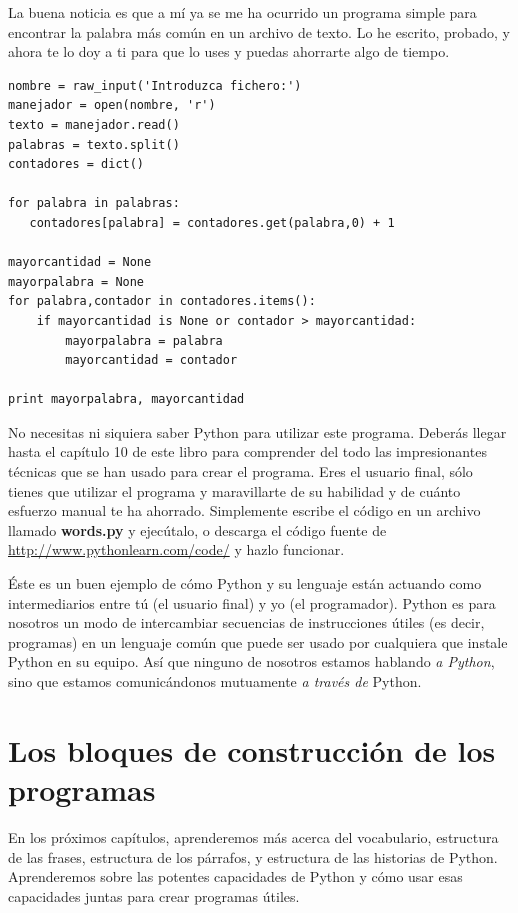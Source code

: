 La buena noticia es que a mí ya se me ha ocurrido un programa
simple para encontrar la palabra más común en un archivo de texto. Lo he escrito,
probado, y ahora te lo doy a ti para que lo uses y puedas ahorrarte algo de tiempo.

\beforeverb
\begin{verbatim}
nombre = raw_input('Introduzca fichero:')
manejador = open(nombre, 'r')
texto = manejador.read()
palabras = texto.split()
contadores = dict()

for palabra in palabras:
   contadores[palabra] = contadores.get(palabra,0) + 1

mayorcantidad = None
mayorpalabra = None
for palabra,contador in contadores.items():
    if mayorcantidad is None or contador > mayorcantidad:
        mayorpalabra = palabra
        mayorcantidad = contador

print mayorpalabra, mayorcantidad
\end{verbatim}
\afterverb
%
No necesitas ni siquiera saber Python para utilizar este programa. Deberás llegar hasta
el capítulo 10 de este libro para comprender del todo las impresionantes técnicas que
se han usado para crear el programa. Eres el usuario final, sólo tienes que utilizar el
programa y maravillarte de su habilidad y de cuánto esfuerzo manual te ha ahorrado.
Simplemente escribe el código
en un archivo llamado {\bf words.py} y ejecútalo, o descarga el código fuente
de \url{http://www.pythonlearn.com/code/} y hazlo funcionar.

Éste es un buen ejemplo de cómo Python y su lenguaje están actuando como
intermediarios entre tú (el usuario final) y yo (el programador). Python es para nosotros
un modo de intercambiar secuencias de instrucciones útiles (es decir, programas) en un
lenguaje común que puede ser usado por cualquiera que instale
Python en su equipo. Así que ninguno de nosotros estamos hablando {\em a Python},
sino que estamos comunicándonos mutuamente {\em a través de} Python.

\section{Los bloques de construcción de los programas}

En los próximos capítulos, aprenderemos más acerca del vocabulario, estructura de las
frases, estructura de los párrafos, y estructura de las historias de Python. Aprenderemos
sobre las potentes capacidades de Python y cómo usar esas capacidades juntas para crear
programas útiles.

